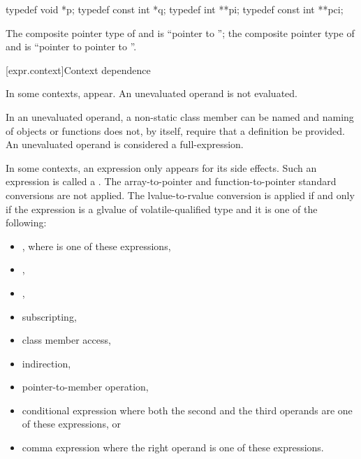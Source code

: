 \begin{example}
\begin{codeblock}
typedef void *p;
typedef const int *q;
typedef int **pi;
typedef const int **pci;
\end{codeblock}

The composite pointer type of  and  is ``pointer to ''; the
composite pointer type of  and  is ``pointer to  pointer to
''.
\end{example}

[expr.context]{Context dependence}

\pnum
\label{term.unevaluated.operand}%
In some contexts, 
appear.
An unevaluated operand is not evaluated.
\begin{note}
In an unevaluated operand, a non-static class member can be
named and naming of objects or functions does not, by
itself, require that a definition be provided.
An unevaluated operand is considered a full-expression.
\end{note}

\pnum
In some contexts, an expression only appears for its side effects. Such an
expression is called a .
The array-to-pointer
and function-to-pointer standard conversions are not
applied. The lvalue-to-rvalue conversion is applied
if and only if
the expression is a glvalue of volatile-qualified type and it is one of the
following:

\begin{itemize}
\item \tcode{(}  \tcode{)}, where
   is one of these expressions,
\item {},
\item {},
\item subscripting,
\item class member access,
\item indirection,
\item pointer-to-member operation,
\item conditional expression where both the second and the
      third operands are one of these expressions, or
\item comma expression where the right operand is one of
      these expressions.
\end{itemize}

